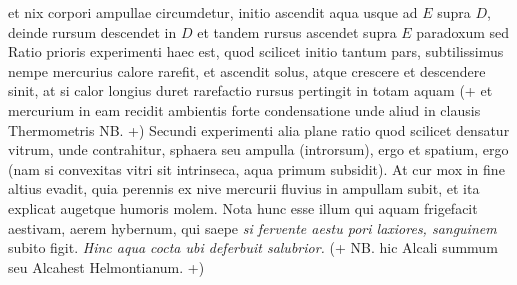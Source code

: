  et nix corpori ampullae circumdetur, initio ascendit aqua usque ad $E$ supra $D$, deinde rursum descendet in $D$ et tandem rursus ascendet  supra $E$ paradoxum sed  Ratio prioris experimenti haec est, quod scilicet initio tantum pars, subtilissimus nempe mercurius\protect{} calore\protect{} rarefit, et ascendit solus, atque  crescere et descendere sinit, at si calor longius duret rarefactio\protect{} rursus pertingit in totam aquam (+ et mercurium in eam recidit ambientis forte condensatione\protect{} unde aliud in clausis Thermometris\protect{} NB. +)
  Secundi experimenti alia plane ratio  quod scilicet densatur vitrum, unde contrahitur, sphaera seu ampulla (introrsum), ergo et spatium, ergo   (nam si convexitas vitri\protect{} sit intrinseca, aqua primum subsidit). At cur mox in fine altius evadit, quia perennis ex nive mercurii\protect{} fluvius in ampullam  subit, et ita explicat augetque humoris molem\protect{}. Nota hunc esse illum  qui aquam frigefacit aestivam, aerem hybernum, qui saepe \textit{si fervente aestu pori laxiores, sanguinem} subito figit. 
\textit{Hinc aqua cocta ubi deferbuit salubrior.} (+ NB. hic  Alcali\protect{} summum seu Alcahest\protect{} Helmontianum. +) 
